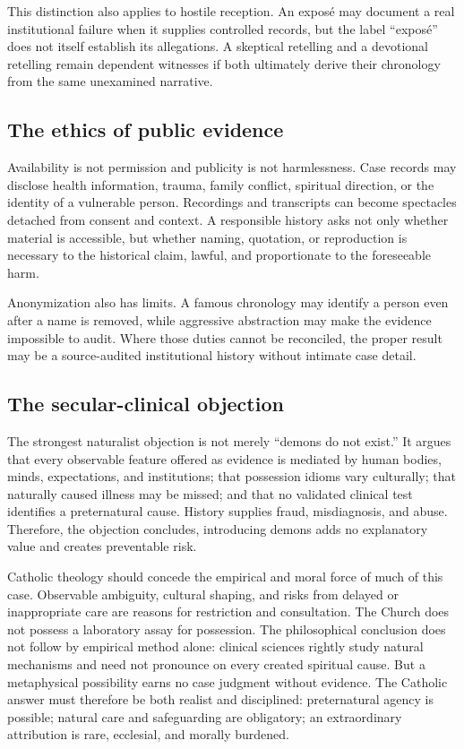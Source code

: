 This distinction also applies to hostile reception.  An exposé may document a
real institutional failure when it supplies controlled records, but the label
``exposé'' does not itself establish its allegations.  A skeptical retelling
and a devotional retelling remain dependent witnesses if both ultimately
derive their chronology from the same unexamined narrative.

\subsection{The ethics of public evidence}

Availability is not permission and publicity is not harmlessness.  Case
records may disclose health information, trauma, family conflict, spiritual
direction, or the identity of a vulnerable person.  Recordings and transcripts
can become spectacles detached from consent and context.  A responsible
history asks not only whether material is accessible, but whether naming,
quotation, or reproduction is necessary to the historical claim, lawful, and
proportionate to the foreseeable harm.

Anonymization also has limits.  A famous chronology may identify a person even
after a name is removed, while aggressive abstraction may make the evidence
impossible to audit.  Where those duties cannot be reconciled, the proper
result may be a source-audited institutional history without intimate case
detail.

\subsection{The secular-clinical objection}

The strongest naturalist objection is not merely ``demons do not exist.'' It
argues that every observable feature offered as evidence is mediated by human
bodies, minds, expectations, and institutions; that possession idioms vary
culturally; that naturally caused illness may be missed; and that no validated
clinical test identifies a preternatural cause. History supplies fraud, misdiagnosis, and
abuse. Therefore, the objection concludes, introducing demons adds no
explanatory value and creates preventable risk.

Catholic theology should concede the empirical and moral force of much of this
case. Observable ambiguity, cultural shaping, and risks from delayed or
inappropriate care are reasons for restriction and consultation. The Church does not possess a
laboratory assay for possession. The philosophical conclusion does not follow
by empirical method alone: clinical sciences rightly study natural mechanisms
and need not pronounce on every created spiritual cause. But a metaphysical
possibility earns no case judgment without evidence. The Catholic answer must
therefore be both realist and disciplined: preternatural agency is possible;
natural care and safeguarding are obligatory; an extraordinary attribution is
rare, ecclesial, and morally burdened.

